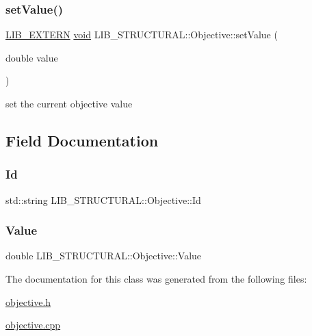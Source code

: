 \subsubsection{\texorpdfstring{set\+Value()}{setValue()}}
{\footnotesize\ttfamily \hyperlink{libutil_8h_a48cc004c21e097c0d7c1c5fa8dc03b96}{L\+I\+B\+\_\+\+E\+X\+T\+E\+RN} \hyperlink{lp__lib_8h_ac7828c7b2b31d2e11af17bdb6289c5d9}{void} L\+I\+B\+\_\+\+S\+T\+R\+U\+C\+T\+U\+R\+A\+L\+::\+Objective\+::set\+Value (\begin{DoxyParamCaption}\item[{double}]{value }\end{DoxyParamCaption})\hspace{0.3cm}{\ttfamily [inline]}}



set the current objective value 



\subsection{Field Documentation}
\mbox{\label{class_l_i_b___s_t_r_u_c_t_u_r_a_l_1_1_objective_aa8263b47a8a71acc061d15fba04879c7}} 
\subsubsection{\texorpdfstring{Id}{Id}}
{\footnotesize\ttfamily std\+::string L\+I\+B\+\_\+\+S\+T\+R\+U\+C\+T\+U\+R\+A\+L\+::\+Objective\+::\+Id}

\mbox{\label{class_l_i_b___s_t_r_u_c_t_u_r_a_l_1_1_objective_ad16219309ff97937c5e4fec319abe863}} 
\subsubsection{\texorpdfstring{Value}{Value}}
{\footnotesize\ttfamily double L\+I\+B\+\_\+\+S\+T\+R\+U\+C\+T\+U\+R\+A\+L\+::\+Objective\+::\+Value}



The documentation for this class was generated from the following files\+:\begin{DoxyCompactItemize}
\item 
\hyperlink{objective_8h}{objective.\+h}\item 
\hyperlink{objective_8cpp}{objective.\+cpp}\end{DoxyCompactItemize}
